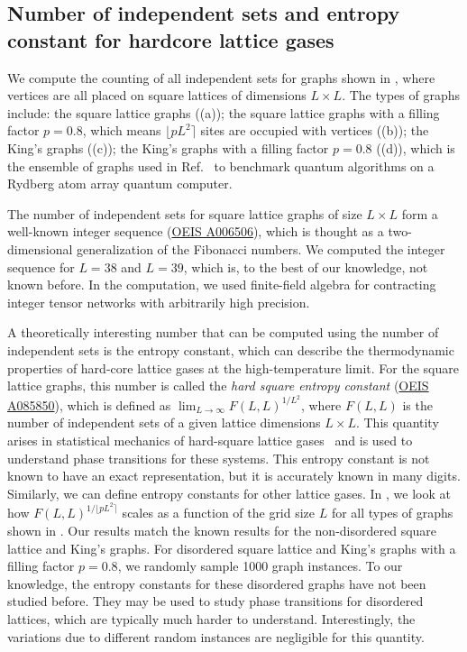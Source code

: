 \documentclass[review, onefignum, onetabnum]{siamart190516}
\begin{document}
\subsection{Number of independent sets and entropy constant for hardcore lattice gases}\label{sec:entropy}
We compute the counting of all independent sets for graphs shown in , where vertices are all placed on square lattices of dimensions $L \times L$.
The types of graphs include: the square lattice graphs ((a)); the square lattice graphs with a filling factor $p=0.8$, which means $\lfloor pL^{2} \rceil$ sites are occupied with vertices  ((b));
the King's graphs  ((c)); the King's graphs with a filling factor $p = 0.8$  ((d)), which is the ensemble of graphs used in Ref.~\cite{Ebadi2022} to benchmark quantum algorithms on a Rydberg atom array quantum computer. 

The number of independent sets for square lattice graphs of size $L \times L$ form a well-known integer sequence (\href{https://oeis.org/A006506}{OEIS A006506}), which is thought as a two-dimensional generalization of the Fibonacci numbers.
We computed the integer sequence for $L=38$ and $L=39$, which is, to the best of our knowledge, not known before.
In the computation, we used finite-field algebra for contracting integer tensor networks with arbitrarily high precision. 

A theoretically interesting number that can be computed using the number of independent sets is the entropy constant, which can describe the thermodynamic properties of hard-core lattice gases at the high-temperature limit.
For the square lattice graphs, this number is called the \textit{hard square entropy constant} (\href{https://oeis.org/A085850}{OEIS A085850}), which is defined as $\lim_{L\rightarrow \infty} F(L,L)^{1/L^2}$, where $F(L,L)$ is the number of independent sets of a given lattice dimensions $L \times L$.
This quantity arises in statistical mechanics of hard-square lattice gases~\cite{Baxter1980, Pearce1988} and is used to understand phase transitions for these systems. This entropy constant is not known to have an exact representation, but it is accurately known in many digits. Similarly, we can define entropy constants for other lattice gases. In , we look at how $F(L,L)^{1/\lfloor pL^2\rceil}$ scales as a function of the grid size $L$ for all types of graphs shown in . Our results match the known results for the non-disordered square lattice and King's graphs. For disordered square lattice and King's graphs with a filling factor $p=0.8$, we randomly sample 1000 graph instances. To our knowledge, the entropy constants for these disordered graphs have not been studied before. They may be used to study phase transitions for disordered lattices, which are typically much harder to understand. Interestingly, the variations due to different random instances are negligible for this quantity. 
\end{document}
